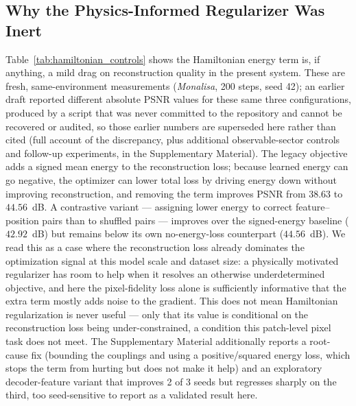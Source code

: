 \documentclass[sn-mathphys,Numbered]{sn-jnl}
\begin{document}
\subsection{Why the Physics-Informed Regularizer Was Inert}
\label{sec:regularizer_inert}
Table~\ref{tab:hamiltonian_controls} shows the Hamiltonian energy term is, if anything, a mild drag on reconstruction quality in the present system. These are fresh, same-environment measurements (\textit{Monalisa}, 200 steps, seed 42); an earlier draft reported different absolute PSNR values for these same three configurations, produced by a script that was never committed to the repository and cannot be recovered or audited, so those earlier numbers are superseded here rather than cited (full account of the discrepancy, plus additional observable-sector controls and follow-up experiments, in the Supplementary Material). The legacy objective adds a signed mean energy to the reconstruction loss; because learned energy can go negative, the optimizer can lower total loss by driving energy down without improving reconstruction, and removing the term improves PSNR from $38.63$ to $44.56$~dB. A contrastive variant --- assigning lower energy to correct feature--position pairs than to shuffled pairs --- improves over the signed-energy baseline ($42.92$~dB) but remains below its own no-energy-loss counterpart ($44.56$~dB). We read this as a case where the reconstruction loss already dominates the optimization signal at this model scale and dataset size: a physically motivated regularizer has room to help when it resolves an otherwise underdetermined objective, and here the pixel-fidelity loss alone is sufficiently informative that the extra term mostly adds noise to the gradient. This does not mean Hamiltonian regularization is never useful --- only that its value is conditional on the reconstruction loss being under-constrained, a condition this patch-level pixel task does not meet. The Supplementary Material additionally reports a root-cause fix (bounding the couplings and using a positive/squared energy loss, which stops the term from hurting but does not make it help) and an exploratory decoder-feature variant that improves 2 of 3 seeds but regresses sharply on the third, too seed-sensitive to report as a validated result here.
\end{document}

